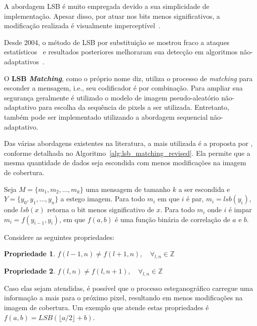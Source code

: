 A abordagem LSB é muito empregada devido a sua simplicidade de implementação. Apesar disso, por atuar nos bits menos significativos, a modificação realizada é visualmente imperceptível~\cite{li2011survey}.

Desde 2004, o método de LSB por substituição se mostrou fraco a ataques estatísticos~\cite{ker} e resultados posteriores melhoraram sua detecção em algoritmos não-adaptativos~\cite{spam}.

O \textbf{LSB \textit{Matching}}, como o próprio nome diz, utiliza o processo de \textit{matching} para esconder a mensagem, i.e., seu codificador é por combinação. Para ampliar sua segurança geralmente é utilizado o modelo de imagem pseudo-aleatório não-adaptativo para escolha da sequência de pixels a ser utilizada. Entretanto, também pode ser implementado utilizando a abordagem sequencial não-adaptativo.

Das várias abordagens existentes na literatura, a mais utilizada é a proposta por , conforme detalhada no Algoritmo~\ref{alg:lsb_matching_revised}. Ela permite que a mesma quantidade de dados seja escondida com menos modificações na imagem de cobertura.

Seja $M = \{m_1, m_2, \dots, m_k\}$ uma mensagem de tamanho $k$ a ser escondida e $Y = \{y_0, y_1, \dots, y_n\}$ a estego imagem. Para todo $m_i$ em que $i$ é par, $m_i = lsb(y_i)$, onde $lsb(x)$ retorna o bit menos significativo de $x$. Para todo $m_i$ onde $i$ é impar $m_i = f(y_{i-1}, y_i)$, em que $f(a, b)$ é uma função binária de correlação de $a$ e $b$. 

Considere as seguintes propriedades:

\newtheorem{property}{Propriedade}
\begin{property}
	$
		\label{eq:lsb_matching_f_property_0}
		f(l - 1, n) \ne f(l + 1, n), \quad \forall_{l, n} \in \mathbb{Z}
	$
\end{property}

\begin{property}
	$
		\label{eq:lsb_matching_f_property_1}
		f(l, n) \ne f(l, n + 1), \quad \forall_{l, n} \in \mathbb{Z}
	$
\end{property}

Caso elas sejam atendidas, é possível que o processo esteganográfico carregue uma informação a mais para o próximo pixel, resultando em menos modificações na imagem de cobertura. Um exemplo que atende estas propriedades é $f(a, b) = LSB(\lfloor a/2\rfloor + b)$. 

